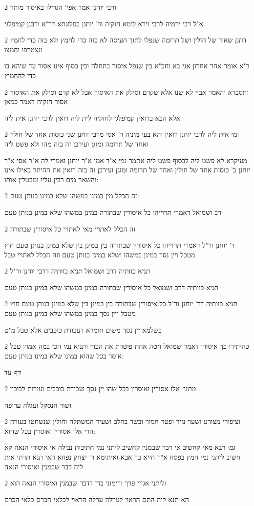 \documentclass[12pt, openany]{book}
\newcommand{\sethebfont}{
\fontsize{10.5pt}{21.0pt} \selectfont
}
\newcommand{\twocol}[1]{
	{\sethebfont \begin{multicols}{2}
			#1
	\end{multicols}}	
}
\newcommand{\sectname}{}
\newcommand{\newsection}[1]{
	\addcontentsline{toc}{section}{#1}
	\renewcommand{\sectname}{#1}	
	\vspace{-\baselineskip}
	\begin{center}
		\textbf{%
\fontsize{16pt}{16pt}\selectfont
			#1}
	\end{center}
	\vspace{-\baselineskip}
	\nopagebreak
}
\begin{document}
\twocol{ורבי יוחנן אמר אפי' הגדילו באיסור מותר
\par א"ל רבי ירמיה לרבי זירא לימא חזקיה ור' יוחנן בפלוגתא דר"א ורבנן קמיפלגי}
\twocol{דתנן שאור של חולין ושל תרומה שנפלו לתוך העיסה לא בזה כדי לחמץ ולא בזה כדי לחמץ ונצטרפו וחמצו
\par ר"א אומר אחר אחרון אני בא וחכ"א בין שנפל איסור בתחלה ובין בסוף אינו אסור עד שיהא בו כדי להחמיץ}
\twocol{ותסברא והאמר אביי לא שנו אלא שקדם וסילק את האיסור אבל לא קדם וסילק את האיסור אסור חזקיה דאמר כמאן
\par אלא הכא ברואין קמיפלגי לחזקיה לית ליה רואין לרבי יוחנן אית ליה}
\twocol{ומי אית ליה לרבי יוחנן רואין והא בעי מיניה ר' אסי מרבי יוחנן שני כוסות אחד של חולין ואחד של תרומה ומזגן ועירבן זה בזה מהו ולא פשט ליה
\par מעיקרא לא פשט ליה לבסוף פשט ליה אתמר נמי א"ר אמי א"ר יוחנן ואמרי לה א"ר אסי א"ר יוחנן ב' כוסות אחד של חולין ואחד של תרומה ומזגן ועירבן זה בזה רואין את ההיתר כאילו אינו והשאר מים רבין עליו ומבטלין אותו:}
\twocol{זה הכלל מין במינו במשהו שלא במינו בנותן טעם:
\par רב ושמואל דאמרי תרוייהו כל איסורין שבתורה במינן במשהו שלא במינן בנותן טעם}
\twocol{זה הכלל לאתויי מאי לאתויי כל איסורין שבתורה
\par ר' יוחנן ור"ל דאמרי תרוייהו כל איסורין שבתורה בין במינן בין שלא במינן בנותן טעם חוץ מטבל ויין נסך במינן במשהו ושלא במינן בנותן טעם וזה הכלל לאתויי טבל}
\twocol{תניא כוותיה דרב ושמואל תניא כוותיה דרבי יוחנן ור"ל
\par תניא כוותיה דרב ושמואל כל איסורין שבתורה במינן במשהו שלא במינן בנותן טעם}
\twocol{תניא כוותיה דר' יוחנן ור"ל כל איסורין שבתורה בין במינן בין שלא במינן בנותן טעם חוץ מטבל ויין נסך במינן במשהו שלא במינן בנותן טעם
\par בשלמא יין נסך משום חומרא דעבודת כוכבים אלא טבל מ"ט}
\twocol{כהיתירו כך איסורו דאמר שמואל חטה אחת פוטרת את הכרי ותניא נמי הכי במה אמרו טבל אוסר בכל שהוא במינו שלא במינו בנותן טעם:}
\newsection{דף עד}
\twocol{{\large\emph{מתני׳}} אלו אסורין ואוסרין בכל שהו יין נסך ועבודת כוכבים ועורות לבובין
\par ושור הנסקל ועגלה ערופה}
\twocol{וציפורי מצורע ושער נזיר ופטר חמור ובשר בחלב ושעיר המשתלח וחולין שנשחטו בעזרה הרי אלו אסורין ואוסרין בכל שהוא:
\par {\large\emph{גמ׳}} תנא מאי קחשיב אי דבר שבמנין קחשיב ליתני נמי חתיכות נבילה אי איסורי הנאה קא חשיב ליתני נמי חמץ בפסח א"ר חייא בר אבא ואיתימא ר' יצחק נפחא האי תנא תרתי אית ליה דבר שבמנין ואיסורי הנאה}
\twocol{וליתני אגוזי פרך ורימוני בדן דדבר שבמנין ואיסורי הנאה הוא
\par הא תנא ליה התם הראוי לערלה ערלה הראוי לכלאי הכרם כלאי הכרם}
\end{document}
